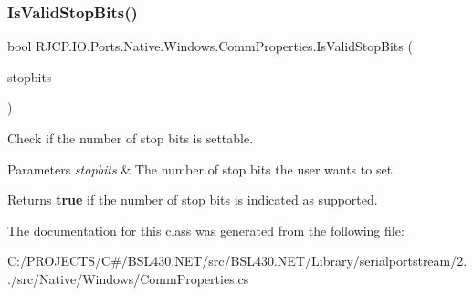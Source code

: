 \subsubsection{\texorpdfstring{IsValidStopBits()}{IsValidStopBits()}}
{\footnotesize\ttfamily bool R\+J\+C\+P.\+I\+O.\+Ports.\+Native.\+Windows.\+Comm\+Properties.\+Is\+Valid\+Stop\+Bits (\begin{DoxyParamCaption}\item[{\mbox{\hyperlink{namespace_r_j_c_p_1_1_i_o_1_1_ports_a56a13b591d46736acafe20f2976c84fa}{Stop\+Bits}}}]{stopbits }\end{DoxyParamCaption})}



Check if the number of stop bits is settable. 


\begin{DoxyParams}{Parameters}
{\em stopbits} & The number of stop bits the user wants to set.\\
\hline
\end{DoxyParams}
\begin{DoxyReturn}{Returns}
{\bfseries{true}} if the number of stop bits is indicated as supported.
\end{DoxyReturn}


The documentation for this class was generated from the following file\+:\begin{DoxyCompactItemize}
\item 
C\+:/\+P\+R\+O\+J\+E\+C\+T\+S/\+C\#/\+B\+S\+L430.\+N\+E\+T/src/\+B\+S\+L430.\+N\+E\+T/\+Library/serialportstream/2../src/\+Native/\+Windows/Comm\+Properties.\+cs\end{DoxyCompactItemize}
